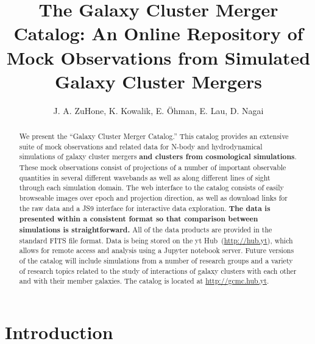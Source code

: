 \documentclass{emulateapj}
\begin{document}
\title{The Galaxy Cluster Merger Catalog: An Online Repository of Mock Observations from Simulated Galaxy Cluster Mergers}

\author{J. A. ZuHone, K. Kowalik, E. \"{O}hman, E. Lau, D. Nagai}


\begin{abstract}
We present the ``Galaxy Cluster Merger Catalog.'' This catalog provides an extensive suite of mock observations and related data for N-body and hydrodynamical simulations of galaxy cluster mergers {\bf and clusters from cosmological simulations}. These mock observations consist of projections of a number of important observable quantities in several different wavebands as well as along different lines of sight through each simulation domain. The web interface to the catalog consists of easily browseable images over epoch and projection direction, as well as download links for the raw data and a JS9 interface for interactive data exploration. {\bf The data is presented within a consistent format so that comparison between simulations is straightforward.} All of the data products are provided in the standard FITS file format. Data is being stored on the yt Hub~(\url{http://hub.yt}), which allows for remote access and analysis using a Jupyter notebook server. Future versions of the catalog will include simulations from a number of research groups and a variety of research topics related to the study of interactions of galaxy clusters with each other and with their member galaxies. The catalog is located at \url{http://gcmc.hub.yt}.
\end{abstract}


\section{Introduction}\label{sec:intro}
\end{document}
